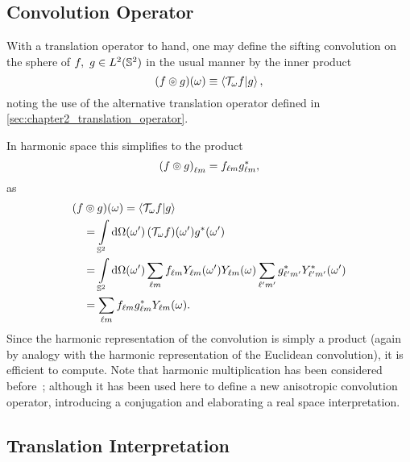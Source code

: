 \subsection{Convolution Operator}

With a translation operator to hand, one may define the sifting convolution on the sphere of \(f,\ g \in \hilbert{\twoSphere}\) in the usual manner by the inner product
%
\begin{equation}\label{eq:chapter2_convolution_real}
	\pixel{\convolution{f}{g}} \equiv \braket{\translation{\omega}f}{g},
\end{equation}
noting the use of the alternative translation operator defined in \cref{sec:chapter2_translation_operator}.

In harmonic space this simplifies to the product
%
\begin{equation}\label{eq:chapter2_convolution_harmonic}
	\harmonic{\convolution{f}{g}} = \harmonic{f} \conj{\harmonic{g}},
\end{equation}
as
\begin{align}
	\pixel{(f & \circledcirc g)} = \braket{\translation{\omega}f}{g} \nonumber{}                                                                                                                        \\
	          & = \integrateSphere{\omega'} \pixel[']{(\translation{\omega}f)} \pixel[']{\conj{g}} \nonumber{}                                                                                          \\
	          & = \integrateSphere{\omega'} \harmonicSum \harmonic{f} \pixel[']{\harmonic{Y}} \pixel{\harmonic{Y}} \harmonicSum['] \conj{\harmonic[']{g}} \pixel[']{\conj{\harmonic[']{Y}}} \nonumber{} \\
	          & = \harmonicSum \harmonic{f} \conj{\harmonic{g}} \pixel{\harmonic{Y}}.
\end{align}
%
Since the harmonic representation of the convolution is simply a product (again by analogy with the harmonic representation of the Euclidean convolution), it is efficient to compute.
Note that harmonic multiplication has been considered before~\cite{Kennedy2011}; although it has been used here to define a new anisotropic convolution operator, introducing a conjugation and elaborating a real space interpretation.

\subsection{Translation Interpretation}\label{sec:chapter2_translation_interpretation}

